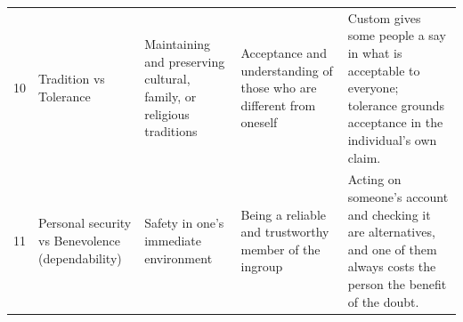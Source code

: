 {\begin{tabular}{@{}rp{3.0cm}p{3.3cm}p{3.3cm}p{5.6cm}@{}}
10 & {\raggedright Tradition vs Tolerance\par} & {\raggedright Maintaining and preserving cultural, family, or religious traditions\par} & {\raggedright Acceptance and understanding of those who are different from oneself\par} & {\raggedright Custom gives some people a say in what is acceptable to everyone; tolerance grounds acceptance in the individual's own claim.\par} \\
11 & {\raggedright Personal security vs Benevolence (dependability)\par} & {\raggedright Safety in one's immediate environment\par} & {\raggedright Being a reliable and trustworthy member of the ingroup\par} & {\raggedright Acting on someone's account and checking it are alternatives, and one of them always costs the person the benefit of the doubt.\par} \\
\bottomrule
\end{tabular}
}%